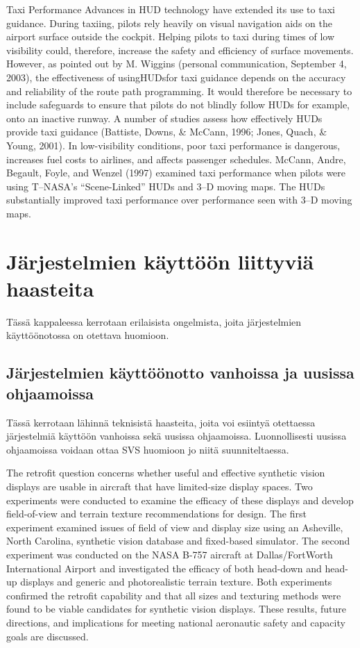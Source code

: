 \documentclass[utf8,bachelor,manualbib]{gradu3}
\begin{document}
Taxi Performance
Advances in HUD technology have extended its use to taxi guidance. During taxiing,
pilots rely heavily on visual navigation aids on the airport surface outside the
cockpit. Helping pilots to taxi during times of low visibility could, therefore, increase
the safety and efficiency of surface movements. However, as pointed out by
M. Wiggins (personal communication, September 4, 2003), the effectiveness of usingHUDsfor
taxi guidance depends on the accuracy and reliability of the route path
programming. It would therefore be necessary to include safeguards to ensure that
pilots do not blindly follow HUDs for example, onto an inactive runway.
A number of studies assess how effectively HUDs provide taxi guidance
(Battiste, Downs, \& McCann, 1996; Jones, Quach, \& Young, 2001). In
low-visibility conditions, poor taxi performance is dangerous, increases fuel costs
to airlines, and affects passenger schedules. McCann, Andre, Begault, Foyle, and
Wenzel (1997) examined taxi performance when pilots were using T–NASA’s
“Scene-Linked” HUDs and 3–D moving maps. The HUDs substantially improved
taxi performance over performance seen with 3–D moving maps. \citep{crawford2006}

\chapter{Järjestelmien käyttöön liittyviä haasteita}

Tässä kappaleessa kerrotaan erilaisista ongelmista, joita järjestelmien käyttöönotossa on otettava huomioon.

\section{Järjestelmien käyttöönotto vanhoissa ja uusissa ohjaamoissa}

Tässä kerrotaan lähinnä teknisistä haasteita, joita voi esiintyä otettaessa järjestelmiä käyttöön vanhoissa sekä uusissa ohjaamoissa. Luonnollisesti uusissa ohjaamoissa voidaan ottaa SVS huomioon jo niitä suunniteltaessa.

The retrofit question concerns whether useful and effective synthetic vision displays
are usable in aircraft that have limited-size display spaces. Two experiments were
conducted to examine the efficacy of these displays and develop field-of-view and
terrain texture recommendations for design. The first experiment examined issues of
field of view and display size using an Asheville, North Carolina, synthetic vision database
and fixed-based simulator. The second experiment was conducted on the
NASA B-757 aircraft at Dallas/FortWorth International Airport and investigated the
efficacy of both head-down and head-up displays and generic and photorealistic terrain
texture. Both experiments confirmed the retrofit capability and that all sizes and
texturing methods were found to be viable candidates for synthetic vision displays.
These results, future directions, and implications for meeting national aeronautic
safety and capacity goals are discussed. \citep{prinzel2004}
\end{document}
